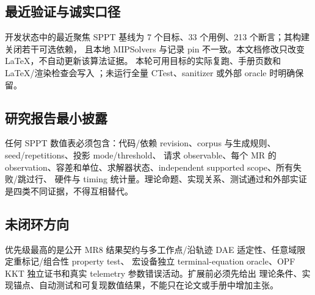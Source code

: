 \subsection{最近验证与诚实口径}

开发状态中的最近聚焦 SPPT 基线为 7 个目标、33 个用例、213 个断言；其构建关闭若干可选依赖，
且本地 MIPSolvers 与记录 pin 不一致。本文档修改只改变 LaTeX，不自动更新该算法证据。
本轮可用目标的实际复跑、手册页数和 LaTeX/渲染检查会写入
；未运行全量 CTest、sanitizer 或外部 oracle 时明确保留。

\subsection{研究报告最小披露}

任何 SPPT 数值表必须包含：代码/依赖 revision、corpus 与生成规则、seed/repetitions、投影 mode/threshold、
请求 observable、每个 MR 的 observation、容差和单位、求解器状态、independent supported scope、所有失败/跳过行、
硬件与 timing 统计量。理论命题、实现关系、测试通过和外部实证是四类不同证据，不得互相替代。

\subsection{未闭环方向}

优先级最高的是公开 MR8 结果契约与多工作点/沿轨迹 DAE 适定性、任意域限定重标记/组合性 property test、
宏设备独立 terminal-equation oracle、OPF KKT 独立证书和真实 telemetry 参数错误活动。扩展前必须先给出
理论条件、实现锚点、自动测试和可复现数值结果，不能只在论文或手册中增加主张。

